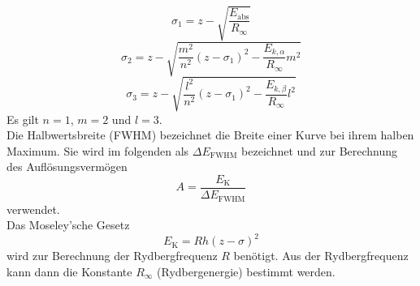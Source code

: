 \begin{equation}
    \sigma_1 = z - \sqrt{\frac{E_\text{abs}}{R_\infty}}
    \label{eqn:sigma1}
\end{equation}
\begin{equation}
    \sigma_2 = z - \sqrt{\frac{m^2}{n^2} \left( z - \sigma_1 \right)^2 - \frac{E_{k,\alpha}}{R_\infty}m^2}
    \label{eqn:sigma2}
\end{equation}
\begin{equation}
    \sigma_3 = z - \sqrt{\frac{l^2}{n^2} \left( z - \sigma_1 \right)^2 - \frac{E_{k,\beta}}{R_\infty}l^2}
    \label{eqn:sigma3}
\end{equation}
Es gilt $n=1$, $m=2$ und $l=3$.
\\
Die Halbwertsbreite (FWHM) bezeichnet die Breite einer Kurve bei ihrem halben Maximum.
Sie wird im folgenden als $\Delta E_\text{FWHM}$ bezeichnet und zur Berechnung des Auflösungsvermögen
\begin{equation}
    A = \frac{E_\text{K}}{\Delta E_\text{FWHM}}
    \label{eqn:aufloesung}
\end{equation}
verwendet.
\\
Das Moseley'sche Gesetz
\begin{equation}
    E_\text{K} = R h (z - \sigma )^2
    \label{eqn:moseley}
\end{equation}
wird zur Berechnung der Rydbergfrequenz $R$ benötigt.
Aus der Rydbergfrequenz kann dann die Konstante $R_\infty$ (Rydbergenergie) bestimmt werden.
